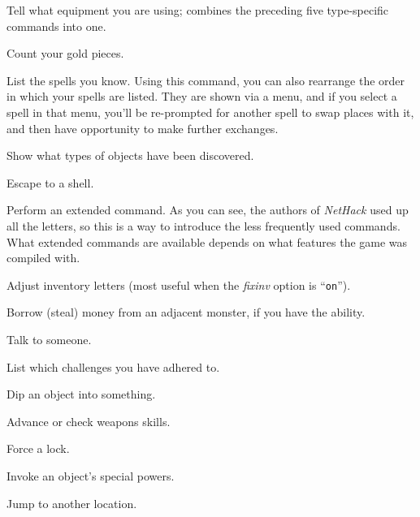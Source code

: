 \item[\tb{*}]
Tell what equipment you are using; combines the preceding five type-specific
commands into one.

\item[\tb{\$}]
Count your gold pieces.

\item[\tb{+}]
List the spells you know.  Using this command, you can also rearrange
the order in which your spells are listed.  They are shown via a menu,
and if you select a spell in that menu, you'll be re-prompted for
another spell to swap places with it, and then have opportunity to
make further exchanges.

\item[\tb{$\backslash$}]
Show what types of objects have been discovered.

\item[\tb{!}]
Escape to a shell.

\item[\tb{\#}]
Perform an extended command.  As you can see, the authors of {\it NetHack\/}
used up all the letters, so this is a way to introduce the less frequently
used commands.
What extended commands are available depends on what features the game was
compiled with.

\item[\tb{\#{\rm adjust}}]
Adjust inventory letters (most useful when the
{\it fixinv\/} 
option is ``{\tt on}'').

\item[\tb{\#{\rm borrow}}]
Borrow (steal) money from an adjacent monster, if you have the ability.

\item[\tb{\#{\rm chat}}]
Talk to someone.

\item[\tb{\#{\rm conduct}}]
List which challenges you have adhered to.

\item[\tb{\#{\rm dip}}]
Dip an object into something.

\item[\tb{\#{\rm enhance}}]
Advance or check weapons skills.

\item[\tb{\#{\rm force}}]
Force a lock.

\item[\tb{\#{\rm invoke}}]
Invoke an object's special powers.

\item[\tb{\#{\rm jump}}]
Jump to another location.

